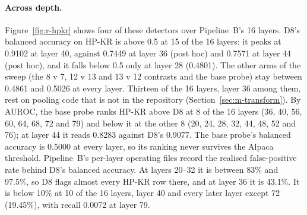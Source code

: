\paragraph{Across depth.}
Figure~\ref{fig:r-hpkr} shows four of these detectors over Pipeline~B's 16 layers. %
D8's balanced accuracy on HP-KR is above 0.5 at 15 of the 16 layers: it peaks at 0.9102 at layer 40, against 0.7449 at layer 36 (post hoc) and 0.7571 at layer 44 (post hoc), and it falls below 0.5 only at layer 28 (0.4801). %
The other arms of the sweep (the 8 v 7, 12 v 13 and 13 v 12 contrasts and the base probe) stay between 0.4861 and 0.5026 at every layer. %
Thirteen of the 16 layers, layer 36 among them, rest on pooling code that is not in the repository (Section~\ref{sec:m-transform}). %
By AUROC, the base probe ranks HP-KR above D8 at 8 of the 16 layers (36, 40, 56, 60, 64, 68, 72 and 79) and below it at the other 8 (20, 24, 28, 32, 44, 48, 52 and 76); at layer 44 it reads 0.8283 against D8's 0.9077. %
The base probe's balanced accuracy is 0.5000 at every layer, so its ranking never survives the Alpaca threshold. %
Pipeline~B's per-layer operating files record the realised false-positive rate behind D8's balanced accuracy. %
At layers 20--32 it is between 83\% and 97.5\%, so D8 flags almost every HP-KR row there, and at layer 36 it is 43.1\%. %
It is below 10\% at 10 of the 16 layers, layer 40 and every later layer except 72 (19.45\%), with recall 0.0072 at layer 79. %

